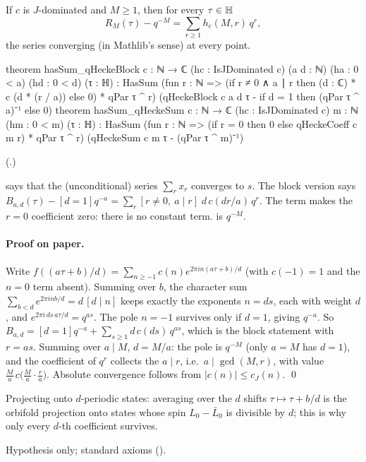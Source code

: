 \begin{theorem}\label{ch19:thm:qheckesum}
If $c$ is $J$-dominated and $M\ge1$, then for every $\tau\in\mathbb{H}$
\begin{equation*}
  R_M(\tau)-q^{-M}=\sum_{r\ge1}h_c(M,r)\,q^r ,
\end{equation*}
the series converging (in Mathlib's  sense) at every point.
\end{theorem}
\begin{leancode}
theorem hasSum_qHeckeBlock {c : ℕ → ℂ} (hc : IsJDominated c) (a d : ℕ) (ha : 0 < a) (hd : 0 < d)
    (τ : ℍ) :
    HasSum (fun r : ℕ => (if r ≠ 0 ∧ a ∣ r then (d : ℂ) * c (d * (r / a)) else 0) * qPar τ ^ r)
      (qHeckeBlock c a d τ - if d = 1 then (qPar τ ^ a)⁻¹ else 0)
theorem hasSum_qHeckeSum {c : ℕ → ℂ} (hc : IsJDominated c) {m : ℕ} (hm : 0 < m) (τ : ℍ) :
    HasSum (fun r : ℕ => (if r = 0 then 0 else qHeckeCoeff c m r) * qPar τ ^ r)
      (qHeckeSum c m τ - (qPar τ ^ m)⁻¹)
\end{leancode}
(.)
\begin{dictionary}
 says that the (unconditional) series $\sum_rx_r$ converges to $s$.  The block version
says $B_{a,d}(\tau)-[d=1]q^{-a}=\sum_{r}[r\ne0,\ a\mid r]\;d\,c(dr/a)\,q^r$.  The term 
makes the $r=0$ coefficient zero: there is no constant term.   is $q^{-M}$.
\end{dictionary}
\paragraph{Proof on paper.}  Write $f((a\tau+b)/d)=\sum_{n\ge-1}c(n)e^{2\pi in(a\tau+b)/d}$ (with $c(-1)=1$ and the $n=0$
term absent).  Summing over $b$, the character sum $\sum_{b<d}e^{2\pi inb/d}=d\,[d\mid n]$ keeps exactly the exponents
$n=ds$, each with weight $d$, and $e^{2\pi i\,ds\,a\tau/d}=q^{as}$.  The pole $n=-1$ survives only if $d=1$, giving
$q^{-a}$.  So $B_{a,d}=[d=1]q^{-a}+\sum_{s\ge1}d\,c(ds)\,q^{as}$, which is the block statement with $r=as$.  Summing over
$a\mid M$, $d=M/a$: the pole is $q^{-M}$ (only $a=M$ has $d=1$), and the coefficient of $q^r$ collects the $a\mid r$, i.e.\
$a\mid\gcd(M,r)$, with value $\frac Ma\,c\bigl(\frac Ma\cdot\frac ra\bigr)$.  Absolute convergence follows from $|c(n)|\le c_J(n)$.
\qed
\begin{physics}
Projecting onto $d$-periodic states: averaging over the $d$ shifts $\tau\mapsto\tau+b/d$ is the orbifold projection onto
states whose spin $L_0-\bar L_0$ is divisible by $d$; this is why only every $d$-th coefficient survives.
\end{physics}
\begin{status}
Hypothesis  only; standard axioms ().
\end{status}

